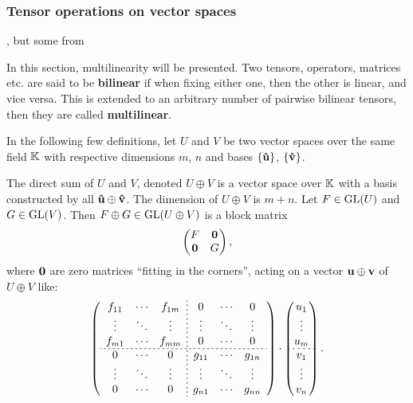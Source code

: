 \subsubsection{Tensor operations on vector spaces}

	\cite{Jeevanjee}, but some from \cite{Holst}
	
	In this section, multilinearity will be presented. Two tensors, operators, matrices etc. are said to be \textbf{bilinear} if when fixing either one, then the other is linear, and vice versa. This is extended to an arbitrary number of pairwise bilinear tensors, then they are called \textbf{multilinear}.
	
	In the following few definitions, let $U$ and $V$ be two vector spaces over the same field $\mathbb{K}$ with respective dimensions $m$, $n$ and bases $\{\mathbf{\hat{u}}\}$, $\{\mathbf{\hat{v}}\}$.
	
	\begin{definition}
		The direct sum of $U$ and $V$, denoted $U \oplus V$ is a vector space over $\mathbb{K}$ with a basis constructed by all $\mathbf{\hat{u}} \oplus \mathbf{\hat{v}}$. The dimension of $U \oplus V$ is $m+n$. Let $F \in \text{GL}(U)$ and $G \in \text{GL}(V)$. Then $F \oplus G \in \text{GL}(U \oplus V)$ is a block matrix
		\begin{align}
			\begin{pmatrix}
				F & \mathbf{0} \\
				\mathbf{0} & G
			\end{pmatrix},
		\end{align}
		where $\mathbf{0}$ are zero matrices ``fitting in the corners'', acting on a vector $\mathbf{u} \oplus \mathbf{v}$ of $U \oplus V$ like:
		\begin{align}
			\left(
			\begin{array}{ccc;{2pt/2pt}ccc}
				f_{11}                    & \cdots & f_{1m} & 0      & \cdots & 0      \\
				\vdots                    & \ddots & \vdots & \vdots & \ddots & \vdots \\
				f_{m1}                    & \cdots & f_{mm} & 0      & \cdots & 0      \\
				\hdashline[2pt/2pt]
				0 & \cdots & 0      & g_{11} & \cdots & g_{1n} \\
				\vdots                    & \ddots & \vdots & \vdots & \ddots & \vdots \\
				0                         & \cdots & 0      & g_{n1} & \cdots & g_{nn}
			\end{array}
			\right)\cdot
			\begin{pmatrix}
				u_1                         \\
				\vdots                          \\
				u_{m}                       \\
				\hdashline[2pt/2pt]
				v_1 \\
				\vdots                          \\
				v_{n}
			\end{pmatrix}.
		\end{align}
	\end{definition}
	
